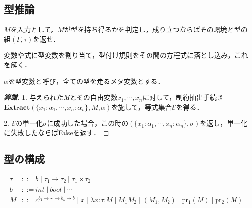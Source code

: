 \documentclass[uplatex, 12pt, dvipdfmx]{jsreport}
\begin{document}
\subsection{型推論}
\begin{question*}
    $M$を入力として，$M$が型を持ち得るかを判定し，成り立つならばその環境と型の組$(\Gamma,\tau)$を返せ．
\end{question*}
変数や式に型変数を割り当て，型付け規則をその間の方程式に落とし込み，これを解く．
\begin{notation}[型変数]
    $\alpha$を型変数と呼び，全ての型を走るメタ変数とする．
\end{notation}
\begin{proof}[\textbf{算譜}]
    1. 与えられた$M$とその自由変数$x_1,\cdots,x_n$に対して，制約抽出手続き$\mathbf{Extract}(\{x_1:\alpha_1,\cdots,x_n:\alpha_n\},M,\alpha)$を施して，等式集合$\mathcal{E}$を得る．

    2. $\mathcal{E}$の単一化$\sigma$に成功した場合，この時の$(\{x_1:\alpha_1,\cdots,x_n:\alpha_n\},\sigma)$を返し，単一化に失敗したならばFalseを返す．
\end{proof}

\subsection{型の構成}

\begin{definition}
    \begin{align*}
        \tau &::= b\mid \tau_1\to\tau_2 \mid \tau_1\times\tau_2 \\
        b &::= int\mid bool\mid\cdots \\
        M &::= c^{b_1\to\cdots\to b_k\to b}\mid x\mid \lambda x:\tau.M\mid M_1M_2 \mid (M_1,M_2) \mid \mathrm{pr_1}(M) \mid \mathrm{pr_2}(M)
    \end{align*}
\end{definition}
\end{document}
